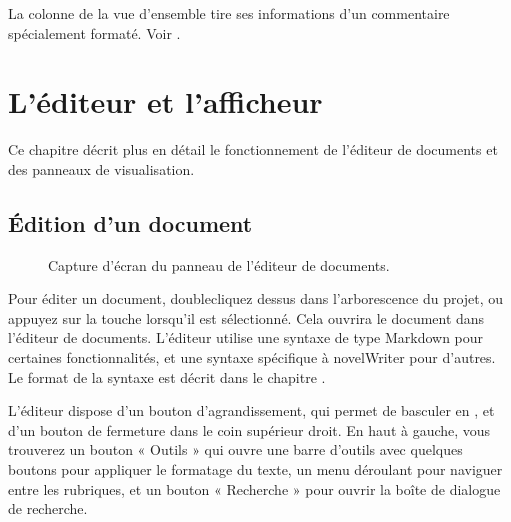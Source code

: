\documentclass[a4paper,11pt,french]{sphinxmanual}
\begin{document}
\sphinxAtStartPar
La colonne  de la vue d’ensemble tire ses informations d’un commentaire spécialement formaté. Voir {\hyperref[\detokenize{usage_format:a-fmt-comm}]{}}.

\sphinxstepscope


\chapter{L’éditeur et l’afficheur}
\label{\detokenize{usage_writing:the-editor-and-viewer}}\label{\detokenize{usage_writing:a-ui-writing}}\label{\detokenize{usage_writing::doc}}
\sphinxAtStartPar
Ce chapitre décrit plus en détail le fonctionnement de l’éditeur de documents et des panneaux de visualisation.


\section{Édition d’un document}
\label{\detokenize{usage_writing:editing-a-document}}\label{\detokenize{usage_writing:a-ui-edit}}
\begin{figure}[htbp]
\centering
\capstart

\noindent{}
\caption{Capture d’écran du panneau de l’éditeur de documents.}\label{\detokenize{usage_writing:id1}}\end{figure}

\sphinxAtStartPar
Pour éditer un document, double\sphinxhyphen{}cliquez dessus dans l’arborescence du projet, ou appuyez sur la touche  lorsqu’il est sélectionné. Cela ouvrira le document dans l’éditeur de documents. L’éditeur utilise une syntaxe de type Markdown pour certaines fonctionnalités, et une syntaxe spécifique à novelWriter pour d’autres. Le format de la syntaxe est décrit dans le chapitre {\hyperref[\detokenize{usage_format:a-fmt}]{}}.

\sphinxAtStartPar
L’éditeur dispose d’un bouton d’agrandissement, qui permet de basculer en , et d’un bouton de fermeture dans le coin supérieur droit. En haut à gauche, vous trouverez un bouton « Outils » qui ouvre une barre d’outils avec quelques boutons pour appliquer le formatage du texte, un menu déroulant pour naviguer entre les rubriques, et un bouton « Recherche » pour ouvrir la boîte de dialogue de recherche.
\end{document}
